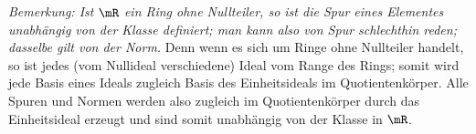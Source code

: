 \emph{Bemerkung: Ist $\mR$ ein Ring ohne Nullteiler, so ist die Spur eines Elementes unabhängig von der Klasse definiert; man kann also von Spur schlechthin reden; dasselbe gilt von der Norm.} Denn wenn es sich um Ringe ohne Nullteiler handelt, so ist jedes (vom Nullideal verschiedene) Ideal vom Range des Rings; somit wird jede Basis eines Ideals zugleich Basis des Einheitsideals im Quotientenkörper. Alle Spuren und Normen werden also zugleich im Quotientenkörper durch das Einheitsideal erzeugt und sind somit unabhängig von der Klasse in $\mR$.